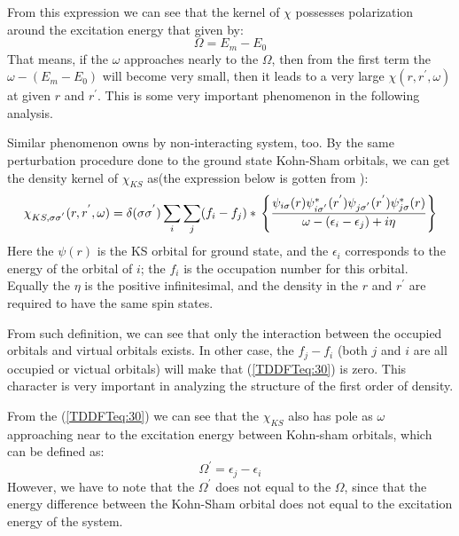 From this expression we can see that the kernel of $\chi$ possesses
polarization around the excitation energy that given by:
\begin{equation}\label{}
\Omega = E_{m} - E_{0}
\end{equation}
That means, if the $\omega$ approaches nearly to the $\Omega$, then
from the first term the $\omega - (E_{m} - E_{0})$ will become very
small, then it leads to a very large $\chi(r,r^{'},\omega)$ at given
$r$ and $r^{'}$. This is some very important phenomenon in the
following analysis.

Similar phenomenon owns by non-interacting system, too. By the same
perturbation procedure done to the ground state Kohn-Sham orbitals,
we can get the density kernel of $\chi_{KS}$
as(the expression below is gotten from \cite{PhysRevA.21.1561,
PhysRevA.38.5512}):
\begin{equation}\label{TDDFTeq:30}
\chi_{KS,\sigma\sigma^{'}}(r,r^{'}, \omega) =\delta(\sigma\sigma^{'})
\sum_{i}\sum_{j}(f_{i} - f_{j})* \\
\left\{\frac{\psi_{i\sigma}(r)\psi_{i\sigma^{'}}^{*}(r^{'})
\psi_{j\sigma^{'}}(r^{'})\psi_{j\sigma}^{*}(r)} {\omega -
(\epsilon_{i} - \epsilon_{j}) + i\eta} \right\}
\end{equation}
Here the $\psi(r)$ is the KS orbital for ground state, and the
$\epsilon_{i}$ corresponds to the energy of the orbital of $i$; the
$f_{i}$ is the occupation number for this orbital. Equally the
$\eta$ is the positive infinitesimal, and the density in the $r$ and
$r^{'}$ are required to have the same spin states.

From such definition, we can see that only the interaction between
the occupied orbitals and virtual orbitals exists. In other case,
the $f_{j} - f_{i}$ (both $j$ and $i$ are all occupied or victual
orbitals) will make that (\ref{TDDFTeq:30}) is zero. This character
is very important in analyzing the structure of the first order of
density.

From the (\ref{TDDFTeq:30}) we can see that the $\chi_{KS}$ also has
pole as $\omega$ approaching near to the excitation energy between
Kohn-sham orbitals, which can be defined as:
\begin{equation}\label{}
\Omega^{'} = \epsilon_{j} - \epsilon_{i}
\end{equation}
However, we have to note that the $\Omega^{'}$ does not equal to the
$\Omega$, since that the energy difference between the Kohn-Sham
orbital does not equal to the excitation energy of the system.

